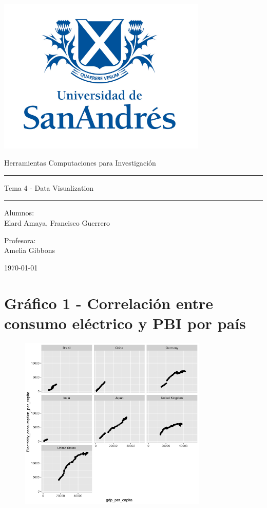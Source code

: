 \documentclass[11pt,a4paper]{article}
\begin{document}
\thispagestyle{empty}
\begin{center}
\includegraphics[width=10cm]{logo udesa.PNG}
\end{center}


	\begin{center}
	\LARGE
	Herramientas Computaciones para Investigación
\\			\vspace{1cm}
\hrule
	\vspace{0.5cm}
	\LARGE
 Tema 4 - Data Visualization
\\		
		\vspace{0.5cm}
		\hrule
				\vspace{1cm}
	\large

	\vspace{2.5cm}
	\large
		Alumnos:\\
	\large
	Elard Amaya, Francisco Guerrero
	
	
	\vspace{1.3cm}
	\normalsize	
	Profesora:\\

	\normalsize
	Amelia Gibbons
	
	\vspace{1.3cm}
	\today
	\end{center}

\clearpage
\section{Gráfico 1 - Correlación entre consumo eléctrico y PBI por país}

\begin{figure}[!h]
    \centering
    \includegraphics[width=9cm]{old/graph1.png}
\end{figure}
\end{document}
